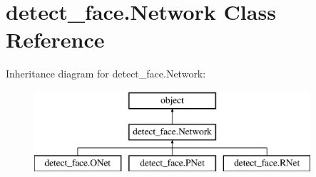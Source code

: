 \hypertarget{classdetect__face_1_1Network}{}\section{detect\+\_\+face.\+Network Class Reference}
\label{classdetect__face_1_1Network}
Inheritance diagram for detect\+\_\+face.\+Network\+:\begin{figure}[H]
\begin{center}
\leavevmode
\includegraphics[height=3.000000cm]{classdetect__face_1_1Network}
\end{center}
\end{figure}
